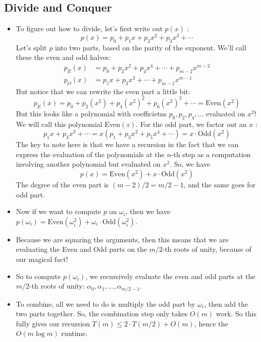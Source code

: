 \subsection{Divide and Conquer}
\begin{itemize}
	\item To figure out how to divide, let's first write out \( p(x) \) :
		\[
		p(x) = p_0 + p_1x + p_2x^2 + p_3x^3 + \cdots
		\] 
		Let's split \( p \) into two parts, based on the parity of the exponent. We'll call these the even and odd 
		halves:
		\begin{align*}
			p_E(x) &= p_0 + p_2x^2 + p_4x^{4} + \cdots + p_{m - 2}x^{m - 2}\\
			p_O(x) &= p_1x + p_3x^3 + \cdots + p_{m - 1} x^{m - 1} 
		\end{align*}
		But notice that we can rewrite the even part a little bit:
		\[
		p_E(x) = p_0 + p_2(x^2) + p_4(x^2)^2 + p_6(x^2)^3 + \cdots = \text{Even}(x^2)
		\] 
		But this looks like a polynomial with coefficietns \( p_0, p_2, p_4, \dots \) evaluated on \( x^2 \)! We will call 
		this polynomial \( \text{Even}(z) \). For the odd part, we factor out an \( x \) :
		\[
		p_1x + p_3x^3 + \cdots = x(p_1 + p_3x^2 + p_5x^{4} + \cdots) = x \cdot \text{Odd}(x^2)
		\] 
		The key to note here is that we have a recursion in the fact that we can express the evaluation of the polynomials 
		at the \( n \)-th step as a computation involving another polynomial but evaluated on \( x^2 \). So, we have 
		\[
		p(x) = \text{Even}(x^2) + x \cdot \text{Odd}(x^2)
		\] 
		The degree of the even part is \( (m - 2) / 2 = m / 2 - 1 \), and the same goes for odd part.   
	\item Now if we want to compute \( p \) on \( \omega_i \), then we have \( p(\omega_i) = \text{Even}(\omega_i^2) + 
		\omega_i \cdot \text{Odd}(\omega_i^2)\). 
	\item Because we are squaring the arguments, then this means that we are evaluating the Even and Odd parts on the 
		\( m / 2 \)-th roots of unity, because of our magical fact!
	\item So to compute \( p(\omega_i) \), we recursively evaluate the even and odd parts at the  \( m / 2 \)-th roots of unity:
		\( \alpha_0, \alpha_1, \dots, \alpha_{m / 2 - 1} \). 
	\item To combine, all we need to do is multiply the odd part by  \( \omega_i \), then add the two parts together. So, the 
		combination step only takes \( O(m) \) work. So this fully gives our recursion \( T(m) \le  2 \cdot T(m / 2) + O(m) \), 
		hence the \( O(m \log m) \) runtime. 
\end{itemize}
